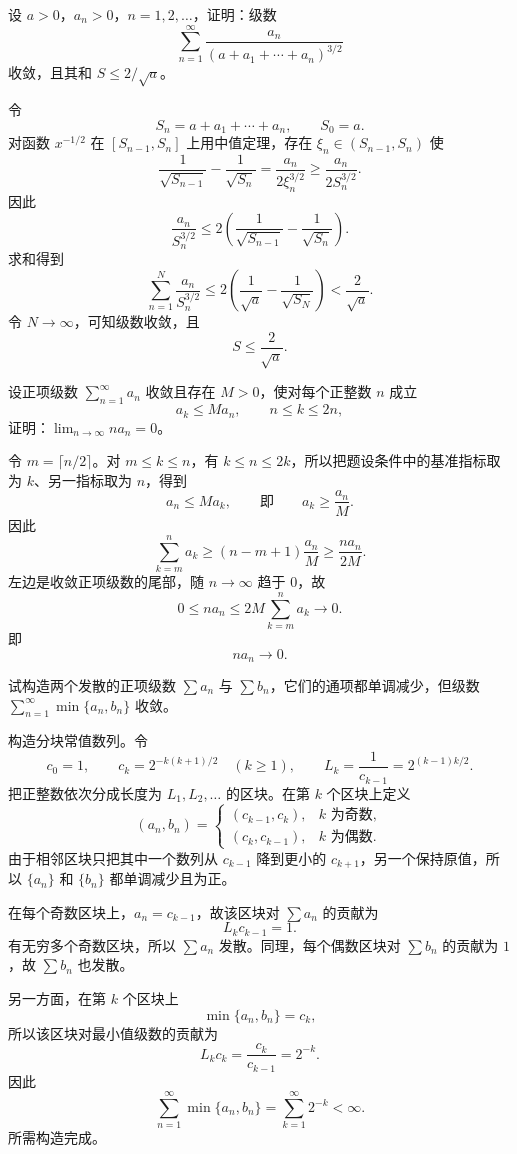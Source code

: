 \begin{xreferenceproblem}[2]
设 $a>0$，$a_n>0$，$n=1,2,\ldots$，证明：级数
\[
\sum_{n=1}^{\infty}\frac{a_n}{(a+a_1+\cdots+a_n)^{3/2}}
\]
收敛，且其和 $S\leq2/\sqrt a$。
\end{xreferenceproblem}
\begin{xsolution}
令
\[
 S_n=a+a_1+\cdots+a_n,
 \qquad S_0=a.
\]
对函数 $x^{-1/2}$ 在 $[S_{n-1},S_n]$ 上用中值定理，存在 $\xi_n\in(S_{n-1},S_n)$ 使
\[
 \frac1{\sqrt{S_{n-1}}}-\frac1{\sqrt{S_n}}
 =\frac{a_n}{2\xi_n^{3/2}}
 \geq\frac{a_n}{2S_n^{3/2}}.
\]
因此
\[
 \frac{a_n}{S_n^{3/2}}
 \leq2\left(\frac1{\sqrt{S_{n-1}}}-\frac1{\sqrt{S_n}}\right).
\]
求和得到
\[
 \sum_{n=1}^{N}\frac{a_n}{S_n^{3/2}}
 \leq2\left(\frac1{\sqrt a}-\frac1{\sqrt{S_N}}\right)
 <\frac2{\sqrt a}.
\]
令 $N\to\infty$，可知级数收敛，且
\[
 \boxed{S\leq\frac2{\sqrt a}}.
\]
\end{xsolution}


\begin{xreferenceproblem}[3]
设正项级数 $\sum_{n=1}^{\infty}a_n$ 收敛且存在 $M>0$，使对每个正整数 $n$ 成立
\[
a_k\leq Ma_n,\qquad n\leq k\leq2n,
\]
证明：$\lim_{n\to\infty}na_n=0$。
\end{xreferenceproblem}
\begin{xsolution}
令 $m=\lceil n/2\rceil$。对 $m\leq k\leq n$，有 $k\leq n\leq2k$，所以把题设条件中的基准指标取为 $k$、另一指标取为 $n$，得到
\[
 a_n\leq Ma_k,
 \qquad\text{即}\qquad
 a_k\geq\frac{a_n}{M}.
\]
因此
\[
 \sum_{k=m}^{n}a_k
 \geq(n-m+1)\frac{a_n}{M}
 \geq\frac{n a_n}{2M}.
\]
左边是收敛正项级数的尾部，随 $n\to\infty$ 趋于 $0$，故
\[
 0\leq na_n\leq2M\sum_{k=m}^{n}a_k\longrightarrow0.
\]
即
\[
 \boxed{na_n\to0}.
\]
\end{xsolution}


\begin{xreferenceproblem}[4]
试构造两个发散的正项级数 $\sum a_n$ 与 $\sum b_n$，它们的通项都单调减少，但级数 $\sum_{n=1}^{\infty}\min\{a_n,b_n\}$ 收敛。
\end{xreferenceproblem}
\begin{xsolution}
构造分块常值数列。令
\[
 c_0=1,
 \qquad
 c_k=2^{-k(k+1)/2}\quad(k\geq1),
 \qquad
 L_k=\frac1{c_{k-1}}=2^{(k-1)k/2}.
\]
把正整数依次分成长度为 $L_1,L_2,\ldots$ 的区块。在第 $k$ 个区块上定义
\[
 (a_n,b_n)=
 \begin{cases}
 (c_{k-1},c_k),&k\text{ 为奇数},\\
 (c_k,c_{k-1}),&k\text{ 为偶数}.
 \end{cases}
\]
由于相邻区块只把其中一个数列从 $c_{k-1}$ 降到更小的 $c_{k+1}$，另一个保持原值，所以 $\{a_n\}$ 和 $\{b_n\}$ 都单调减少且为正。

在每个奇数区块上，$a_n=c_{k-1}$，故该区块对 $\sum a_n$ 的贡献为
\[
 L_kc_{k-1}=1.
\]
有无穷多个奇数区块，所以 $\sum a_n$ 发散。同理，每个偶数区块对 $\sum b_n$ 的贡献为 $1$，故 $\sum b_n$ 也发散。

另一方面，在第 $k$ 个区块上
\[
 \min\{a_n,b_n\}=c_k,
\]
所以该区块对最小值级数的贡献为
\[
 L_kc_k=\frac{c_k}{c_{k-1}}=2^{-k}.
\]
因此
\[
 \sum_{n=1}^{\infty}\min\{a_n,b_n\}
 =\sum_{k=1}^{\infty}2^{-k}<\infty.
\]
所需构造完成。
\end{xsolution}



